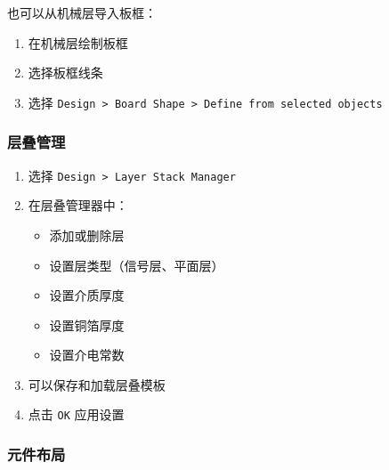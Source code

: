 也可以从机械层导入板框：

\begin{enumerate}
  \item 在机械层绘制板框
  \item 选择板框线条
  \item 选择 \lstinline{Design > Board Shape > Define from selected objects}
\end{enumerate}

\subsubsection{层叠管理}


\begin{enumerate}
  \item 选择 \lstinline{Design > Layer Stack Manager}
  \item 在层叠管理器中：
    \begin{itemize}
      \item 添加或删除层
      \item 设置层类型（信号层、平面层）
      \item 设置介质厚度
      \item 设置铜箔厚度
      \item 设置介电常数
    \end{itemize}
  \item 可以保存和加载层叠模板
  \item 点击 \lstinline{OK} 应用设置
\end{enumerate}

\subsubsection{元件布局}


